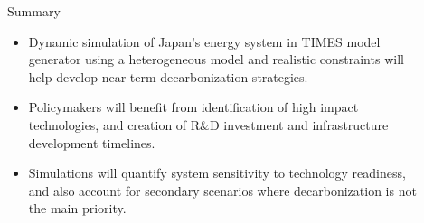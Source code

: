 \documentclass[final]{beamer}
\newlength{\sepwid}
\newlength{\onecolwid}
\newlength{\twocolwid}
\newlength{\threecolwid}
\begin{document}
\begin{frame}[t]
\begin{columns}[t,totalwidth=\threecolwid]
\begin{column}{\onecolwid}
\end{column} %

\begin{column}{\sepwid}\end{column} %

\begin{column}{\onecolwid} %


\begin{block}{Summary}
\begin{itemize}

\item Dynamic simulation of Japan's energy system in TIMES model generator using a heterogeneous model and realistic constraints will help develop near-term decarbonization strategies.

\item Policymakers will benefit from identification of high impact technologies, and creation of R\&D investment and infrastructure development timelines.

\item Simulations will quantify system sensitivity to technology readiness, and also account for secondary scenarios where decarbonization is not the main priority.

\end{itemize}

\end{block}



\end{column} %

\end{columns} %

\begin{columns}[t,totalwidth=\threecolwid] %

\begin{column}{\twocolwid} %


\end{column}
\end{columns}
\end{frame}
\end{document}

